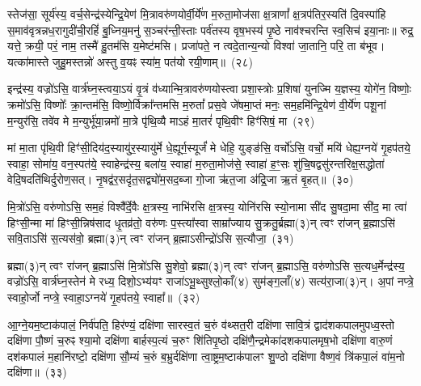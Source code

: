 स्तेज॑सा॒ सूर्य॑स्य॒ वर्च॒सेन्द्र॑स्येन्द्रि॒येण॑ मि॒त्रावरु॑णयोर्वी॒र्ये॑ण म॒रुता॒\-मोज॑सा क्ष॒त्राणां᳚ क्ष॒त्रप॑तिर॒स्यति॑ दि॒वस्पा॑हि स॒माव॑वृत्रन्नध॒रा\-गुदी॑ची॒\-रहिं॑ बु॒ध्निय॒मनु॑ स॒ञ्चर॑न्ती॒स्ताः पर्व॑तस्य वृष॒भस्य॑ पृ॒ष्ठे नाव॑श्चरन्ति स्व॒सिच॑ इया॒नाः॥ रुद्र॒ यत्ते॒ क्रयी॒ परं॒ नाम॒ तस्मै॑ हु॒तम॑सि य॒मेष्ट॑मसि। प्रजा॑पते॒ न त्वदे॒तान्य॒न्यो विश्वा॑ जा॒तानि॒ परि॒ ता ब॑भूव। यत्का॑मास्ते जुहु॒मस्तन्नो॑ अस्तु व॒यꣴ स्या॑म॒ पत॑यो रयी॒णाम्॥~(२८)\ip

{\anuvakamend[{अ॒ग्नेस्तैका॑\-दश च}]}%

इन्द्र॑स्य॒ वज्रो॑\-ऽसि॒ वार्त्र॑घ्न॒स्त्वया॒\-ऽयं वृ॒त्रं व॑ध्यान्मि॒त्रावरु॑ण\-योस्त्वा प्रशा॒स्त्रोः प्र॒शिषा॑ युनज्मि य॒ज्ञस्य॒ योगे॑न॒ विष्णोः॒ क्रमो॑\-ऽसि॒ विष्णोः᳚ क्रा॒न्तम॑सि॒ विष्णो॒र्विक्रा᳚न्तमसि म॒रुतां᳚ प्रस॒वे जे॑षमा॒प्तं मनः॒ सम॒हमि॑न्द्रि॒येण॑ वी॒र्ये॑ण पशू॒नां म॒न्युर॑सि॒ तवे॑व मे म॒न्युर्भू॑या॒न्नमो॑ मा॒त्रे पृ॑थि॒व्यै मा\-ऽहं मा॒तरं॑ पृथि॒वीꣳ हिꣳ॑सिषं॒ मा~(२९)\ip

मां मा॒ता पृ॑थि॒वी हिꣳ॑सी॒दिय॑द॒स्यायु॑र॒स्यायु॑र्मे धे॒ह्यूर्ग॒स्यूर्जं॑ मे धेहि॒ युङ्ङ॑सि॒ वर्चो॑\-ऽसि॒ वर्चो॒ मयि॑ धेह्य॒ग्नये॑ गृ॒हप॑तये॒ स्वाहा॒ सोमा॑य॒ वन॒स्पत॑ये॒ स्वाहेन्द्र॑स्य॒ बला॑य॒ स्वाहा॑ म॒रुता॒मोज॑से॒ स्वाहा॑ ह॒ꣳ॒सः शु॑चि॒षद्वसु॑रन्तरिक्ष॒\-सद्धोता॑ वेदि॒षदति॑थिर्दुरोण॒सत्। नृ॒षद्व॑र॒सदृ॑त॒सद्व्यो॑म॒सद॒ब्जा गो॒जा ऋ॑त॒जा अ॑द्रि॒जा ऋ॒तं बृ॒हत्॥~(३०)\ip

{\anuvakamend[{हि॒ꣳ॒सि॒षं॒ मर्त॒जास्त्रीणि॑ च}]}%

मि॒त्रो॑\-ऽसि॒ वरु॑णो\-ऽसि॒ सम॒हं विश्वै᳚र्दे॒वैः क्ष॒त्रस्य॒ नाभि॑रसि क्ष॒त्रस्य॒ योनि॑रसि स्यो॒नामा सी॑द सु॒षदा॒मा सी॑द॒ मा त्वा॑ हिꣳसी॒न्मा मा॑ हिꣳसी॒न्निष॑साद धृ॒तव्र॑तो॒ वरु॑णः प॒स्त्या᳚स्वा साम्रा᳚ज्याय सु॒क्रतु॒र्ब्रह्मा(३)न् त्वꣳ रा॑जन् ब्र॒ह्मा\-ऽसि॑ सवि॒ता\-ऽसि॑ स॒त्यस॑वो॒ ब्रह्मा(३)न् त्वꣳ रा॑जन् ब्र॒ह्मा\-ऽसीन्द्रो॑\-ऽसि स॒त्यौजा॒~(३१)\ip

ब्रह्मा(३)न् त्वꣳ रा॑जन् ब्र॒ह्मा\-ऽसि॑ मि॒त्रो॑\-ऽसि सु॒शेवो॒ ब्रह्मा(३)न् त्वꣳ रा॑जन् ब्र॒ह्मा\-ऽसि॒ वरु॑णो\-ऽसि स॒त्यध॒र्मेन्द्र॑स्य॒ वज्रो॑\-ऽसि॒ वार्त्र॑घ्न॒स्तेन॑ मे रध्य॒ दिशो॒\-ऽभ्य॑यꣳ राजा॑\-ऽभू॒थ्सुश्लो॒काँ(४) सुम॑ङ्ग॒लाँ(४) सत्य॑रा॒जा(३)न्। अ॒पां नप्त्रे॒ स्वाहो॒र्जो नप्त्रे॒ स्वाहा॒\-ऽग्नये॑ गृ॒हप॑तये॒ स्वाहा᳚॥~(३२)\ip

{\anuvakamend[{स॒त्यौजा᳚श्चत्वारि॒ꣳ॒शच्च॑}]}%

आ॒ग्ने॒यम॒ष्टा\-क॑पालं॒ निर्व॑पति॒ हिर॑ण्यं॒ दक्षि॑णा सारस्व॒तं च॒रुं व॑थ्सत॒री दक्षि॑णा सावि॒त्रं द्वाद॑श\-कपालमुपध्व॒स्तो दक्षि॑णा पौ॒ष्णं च॒रुꣴ श्या॒मो दक्षि॑णा बार्\mbox{}हस्प॒त्यं च॒रुꣳ शि॑तिपृ॒ष्ठो दक्षि॑णै॒न्द्रमेका॑\-दश\-कपालमृष॒भो दक्षि॑णा वारु॒णं दश॑\-कपालं म॒हानि॑रष्टो॒ दक्षि॑णा सौ॒म्यं च॒रुं ब॒भ्रुर्दक्षि॑णा त्वा॒ष्ट्रम॒ष्टाक॑पालꣳ शु॒ण्ठो दक्षि॑णा वैष्ण॒वं त्रि॑कपा॒लं वा॑म॒नो दक्षि॑णा॥~(३३)\ip

